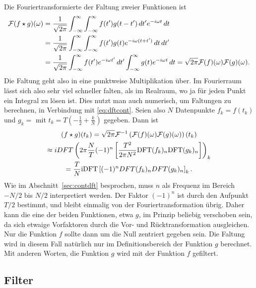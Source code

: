 Die Fouriertransformierte der Faltung zweier Funktionen ist
\begin{equation}
  \label{eq:fourierfaltung}
  \begin{split}
    \mathcal F(f\star g)(\omega) &=
    \frac{1}{\sqrt{2\pi}}\int_{-\infty}^{\infty}
    \int_{-\infty}^{\infty} f(t')g(t-t')\,dt' e^{-i \omega t}\,
    dt\\
    &= \frac{1}{\sqrt{2\pi}}\int_{-\infty}^{\infty}
    \int_{-\infty}^{\infty} f(t') g(t) e^{-i \omega (t+t')}\, dt\,
    dt'\\
    &= \frac{1}{\sqrt{2\pi}} \int_{-\infty}^{\infty} f(t')e^{-i
      \omega t'}\, dt' \int_{-\infty}^{\infty} g(t) e^{-i \omega
      t}\, dt = \sqrt{2\pi}\mathcal F(f)(\omega)\mathcal F(g)(\omega).
  \end{split}
\end{equation}
Die Faltung geht also in eine punktweise Multiplikation über. Im
Fourierraum lässt sich also sehr viel schneller falten, als im
Realraum, wo ja für jeden Punkt ein Integral zu lösen ist. Dies nutzt
man auch numerisch, um Faltungen zu berechnen, in Verbindung mit
\eqref{eq:dftcont}. Seien also $N$ Datenpunkte $f_k = f(t_k)$ und $g_k
= $ mit $t_k = T\left(-\frac{1}{2} + \frac{k}{N}\right)$ gegeben. Dann
ist
\begin{multline}
  \label{eq:discretefold}
  (f\star g)(t_k) =
  \sqrt{2\pi}\mathcal F^{-1}\left(\mathcal F(f)(\omega)\mathcal F(g)(\omega)\right)(t_k)\\
  \approx
  iDFT\left(2\pi \frac{N}{T} (-1)^n
  \left[\frac{T^2}{2\pi N^2}\text{DFT}(f_k)_n\text{DFT}(g_k)_n\right]\right)_k\\
  =
  \frac{T}{N} \text{iDFT}\left[(-1)^n DFT(f_k)_n DFT(g_k)_n\right]_k.
\end{multline}
Wie im Abschnitt~\ref{sec:contdft} besprochen, muss $n$ als Frequenz
im Bereich $-N/2$ bis $N/2$ interpretiert werden. Der Faktor $(-1)^n$
ist durch den Aufpunkt $T/2$ bestimmt, und bleibt einmalig von der
Fouriertransformation übrig. Daher kann die eine der beiden
Funktionen, etwa $g$, im Prinzip beliebig verschoben sein, da sich
etwaige Vorfaktoren durch die Vor- und Rücktransformation
ausgleichen. Nur die Funktion $f$ sollte dann um die Null zentriert
gegeben sein. Die Faltung wird in diesem Fall natürlich nur im
Definitionsbereich der Funktion $g$ berechnet. Mit anderen Worten, die
Funktion $g$ wird mit der Funktion $f$ gefiltert.

\subsection{Filter}

